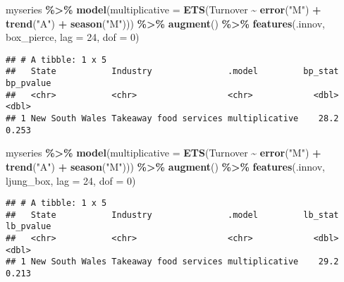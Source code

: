 \documentclass[
]{article}
\newenvironment{Shaded}{\begin{snugshade}}{\end{snugshade}}
\newcommand{\AttributeTok}[1]{\textcolor[rgb]{0.13,0.29,0.53}{#1}}
\newcommand{\DecValTok}[1]{\textcolor[rgb]{0.00,0.00,0.81}{#1}}
\newcommand{\FunctionTok}[1]{\textcolor[rgb]{0.13,0.29,0.53}{\textbf{#1}}}
\newcommand{\NormalTok}[1]{#1}
\newcommand{\SpecialCharTok}[1]{\textcolor[rgb]{0.81,0.36,0.00}{\textbf{#1}}}
\newcommand{\StringTok}[1]{\textcolor[rgb]{0.31,0.60,0.02}{#1}}
\begin{document}
\begin{Shaded}
\begin{Highlighting}[]
\NormalTok{myseries }\SpecialCharTok{\%\textgreater{}\%}
  \FunctionTok{model}\NormalTok{(}\AttributeTok{multiplicative =} \FunctionTok{ETS}\NormalTok{(Turnover }\SpecialCharTok{\textasciitilde{}} \FunctionTok{error}\NormalTok{(}\StringTok{"M"}\NormalTok{) }\SpecialCharTok{+} \FunctionTok{trend}\NormalTok{(}\StringTok{"A"}\NormalTok{) }\SpecialCharTok{+} \FunctionTok{season}\NormalTok{(}\StringTok{"M"}\NormalTok{))) }\SpecialCharTok{\%\textgreater{}\%}
  \FunctionTok{augment}\NormalTok{() }\SpecialCharTok{\%\textgreater{}\%} 
  \FunctionTok{features}\NormalTok{(.innov, box\_pierce, }\AttributeTok{lag =} \DecValTok{24}\NormalTok{, }\AttributeTok{dof =} \DecValTok{0}\NormalTok{)}
\end{Highlighting}
\end{Shaded}

\begin{verbatim}
## # A tibble: 1 x 5
##   State           Industry               .model         bp_stat bp_pvalue
##   <chr>           <chr>                  <chr>            <dbl>     <dbl>
## 1 New South Wales Takeaway food services multiplicative    28.2     0.253
\end{verbatim}

\begin{Shaded}
\begin{Highlighting}[]
\NormalTok{myseries }\SpecialCharTok{\%\textgreater{}\%}
  \FunctionTok{model}\NormalTok{(}\AttributeTok{multiplicative =} \FunctionTok{ETS}\NormalTok{(Turnover }\SpecialCharTok{\textasciitilde{}} \FunctionTok{error}\NormalTok{(}\StringTok{"M"}\NormalTok{) }\SpecialCharTok{+} \FunctionTok{trend}\NormalTok{(}\StringTok{"A"}\NormalTok{) }\SpecialCharTok{+} \FunctionTok{season}\NormalTok{(}\StringTok{"M"}\NormalTok{))) }\SpecialCharTok{\%\textgreater{}\%}
  \FunctionTok{augment}\NormalTok{() }\SpecialCharTok{\%\textgreater{}\%} 
  \FunctionTok{features}\NormalTok{(.innov, ljung\_box, }\AttributeTok{lag =} \DecValTok{24}\NormalTok{, }\AttributeTok{dof =} \DecValTok{0}\NormalTok{)}
\end{Highlighting}
\end{Shaded}

\begin{verbatim}
## # A tibble: 1 x 5
##   State           Industry               .model         lb_stat lb_pvalue
##   <chr>           <chr>                  <chr>            <dbl>     <dbl>
## 1 New South Wales Takeaway food services multiplicative    29.2     0.213
\end{verbatim}
\end{document}
